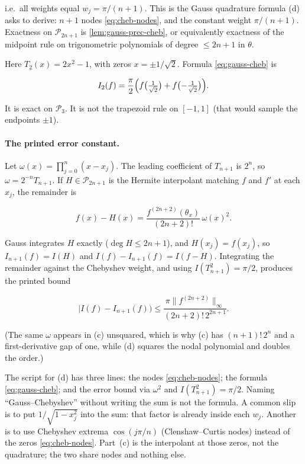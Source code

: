 i.e.\ all weights equal \(w_{j}=\pi/(n+1)\). This is the Gauss quadrature formula (d) asks to derive: \(n+1\) nodes \eqref{eq:cheb-nodes}, and the constant weight \(\pi/(n+1)\). Exactness on \(\mathcal{P}_{2n+1}\) is \cref{lem:gauss-prec-cheb}, or equivalently exactness of the midpoint rule on trigonometric polynomials of degree \(\le 2n+1\) in \(\theta\).

\begin{example}
\label{ex:gauss-cheb-two}
Here \(T_{2}(x)=2x^{2}-1\), with zeros \(x=\pm 1/\sqrt{2}\). Formula \eqref{eq:gauss-cheb} is

\[
I_{2}(f)
=
\frac{\pi}{2}
\Bigl(
f\bigl(\tfrac{1}{\sqrt{2}}\bigr)
+
f\bigl(-\tfrac{1}{\sqrt{2}}\bigr)
\Bigr).
\]

It is exact on \(\mathcal{P}_{3}\). It is not the trapezoid rule on \([-1,1]\) (that would sample the endpoints \(\pm 1\)).
\end{example}

\paragraph{The printed error constant.}

Let \(\omega(x)=\prod_{j=0}^{n}(x-x_{j})\). The leading coefficient of \(T_{n+1}\) is \(2^{n}\), so \(\omega=2^{-n}T_{n+1}\). If \(H\in\mathcal{P}_{2n+1}\) is the Hermite interpolant matching \(f\) and \(f'\) at each \(x_{j}\), the remainder is

\[
f(x)-H(x)
=
\frac{f^{(2n+2)}(\theta_{x})}{(2n+2)!}\,\omega(x)^{2}.
\]

Gauss integrates \(H\) exactly (\(\deg H\le 2n+1\)), and \(H(x_{j})=f(x_{j})\), so \(I_{n+1}(f)=I(H)\) and \(I(f)-I_{n+1}(f)=I(f-H)\). Integrating the remainder against the Chebyshev weight, and using \(I(T_{n+1}^{2})=\pi/2\), produces the printed bound

\[
\bigl|I(f)-I_{n+1}(f)\bigr)
\le
\frac{\pi\|f^{(2n+2)}\|_{\infty}}{(2n+2)!\,2^{2n+1}}.
\]

(The same \(\omega\) appears in (c) unsquared, which is why (c) has \((n+1)!\,2^{n}\) and a first-derivative gap of one, while (d) squares the nodal polynomial and doubles the order.)

\begin{examnote}
\label{examnote:p2-quad}
The script for (d) has three lines: the nodes \eqref{eq:cheb-nodes}; the formula \eqref{eq:gauss-cheb}; and the error bound via \(\omega^{2}\) and \(I(T_{n+1}^{2})=\pi/2\). Naming ``Gauss--Chebyshev'' without writing the sum is not the formula. A common slip is to put \(1/\sqrt{1-x_{j}^{2}}\) into the sum: that factor is already inside each \(w_{j}\). Another is to use Chebyshev extrema \(\cos(j\pi/n)\) (Clenshaw--Curtis nodes) instead of the zeros \eqref{eq:cheb-nodes}. Part~(c) is the interpolant at those zeros, not the quadrature; the two share nodes and nothing else.
\end{examnote}


